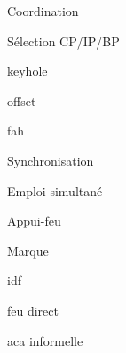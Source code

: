 \begin{e1}
\begin{e2}
		\item Coordination
		\begin{e3}
			\item Sélection CP/IP/BP
			\item \gls{keyhole}
			\item \gls{offset}
			\item \acrfull{fah}
		\end{e3}
		\item Synchronisation
		\begin{e3}
			\item Emploi simultané
			\item Appui-feu
			\begin{e4}
				\item Marque
				\begin{e5}
					\item \gls{idf}
					\item feu direct
				\end{e5}
				\item \gls{aca} informelle
			\end{e4}
		\end{e3}		
	\end{e2}
\end{e1}